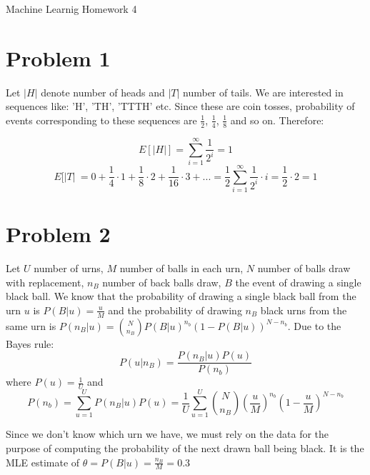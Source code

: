 \documentclass[12pt]{article}
\begin{document}
\begin{center}
{\Large Machine Learnig Homework 4} \\[.3in]
\end{center}
\vspace*{.5in}

\section{Problem 1}

Let $|H|$ denote number of heads and $|T|$ number of tails. We are interested in sequences like: 'H', 'TH', 'TTTH' etc. Since these are coin tosses, probability of events corresponding to these sequences are $\frac{1}{2}$, $\frac{1}{4}$, $\frac{1}{8}$ and so on. Therefore:

\begin{equation}
 E[|H|] = \sum_{i=1}^{\infty} \frac{1}{2^i} = 1
\end{equation}
\begin{equation}
 E[|T|\ = 0 + \frac{1}{4} \cdot 1 + \frac{1}{8} \cdot 2 + \frac{1}{16} \cdot 3 + ... = \frac{1}{2} \sum_{i=1}^{\infty} \frac{1}{2^i} \cdot i = \frac{1}{2} \cdot 2 = 1
\end{equation}

\section{Problem 2}

Let $U$ number of urns, $M$ number of balls in each urn, $N$ number of balls draw with replacement, $n_B$ number of back balls draw, $B$ the event of drawing a single black ball. We know that the probability of drawing a single black ball from the urn $u$ is $P(B|u) = \frac{u}{M}$ and the probability of drawing $n_B$ black urns from the same urn is $P(n_B|u) = \binom{N}{n_B} P(B|u)^{n_b}(1-P(B|u))^{N-n_b}$. Due to the Bayes rule:
\begin{equation}
 P(u|n_B) = \frac{P(n_B|u)P(u)}{P(n_b)}
\end{equation}
where $P(u) = \frac{1}{U}$ and 
\begin{equation}
 P(n_b) = \sum_{u=1}^U P(n_B|u)P(u) = \frac{1}{U} \sum_{u=1}^U \binom{N}{n_B} \left(\frac{u}{M}\right)^{n_b}\left(1-\frac{u}{M}\right)^{N-n_b}
\end{equation}

Since we don't know which urn we have, we must rely on the data for the purpose of computing the probability of the next drawn ball being black. It is the MLE estimate of $\theta = P(B|u) = \frac{n_B}{M} = 0.3$
\end{document}
